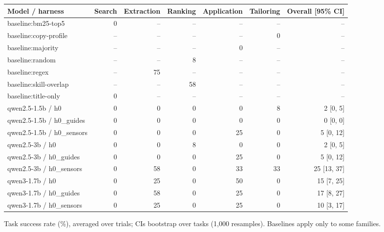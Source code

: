 {\small
\begin{adjustbox}{max width=\linewidth}
\begin{tabular}{lrrrrrr}
\toprule
Model / harness & Search & Extraction & Ranking & Application & Tailoring & Overall [95\% CI] \\
\midrule
baseline:bm25-top5 & 0 & -- & -- & -- & -- & -- \\
baseline:copy-profile & -- & -- & -- & -- & 0 & -- \\
baseline:majority & -- & -- & -- & 0 & -- & -- \\
baseline:random & -- & -- & 8 & -- & -- & -- \\
baseline:regex & -- & 75 & -- & -- & -- & -- \\
baseline:skill-overlap & -- & -- & 58 & -- & -- & -- \\
baseline:title-only & 0 & -- & -- & -- & -- & -- \\
qwen2.5-1.5b / h0 & 0 & 0 & 0 & 0 & 8 & 2 [0, 5] \\
qwen2.5-1.5b / h0\_guides & 0 & 0 & 0 & 0 & 0 & 0 [0, 0] \\
qwen2.5-1.5b / h0\_sensors & 0 & 0 & 0 & 25 & 0 & 5 [0, 12] \\
qwen2.5-3b / h0 & 0 & 0 & 8 & 0 & 0 & 2 [0, 5] \\
qwen2.5-3b / h0\_guides & 0 & 0 & 0 & 25 & 0 & 5 [0, 12] \\
qwen2.5-3b / h0\_sensors & 0 & 58 & 0 & 33 & 33 & 25 [13, 37] \\
qwen3-1.7b / h0 & 0 & 25 & 0 & 50 & 0 & 15 [7, 25] \\
qwen3-1.7b / h0\_guides & 0 & 58 & 0 & 25 & 0 & 17 [8, 27] \\
qwen3-1.7b / h0\_sensors & 0 & 25 & 0 & 25 & 0 & 10 [3, 17] \\
\bottomrule
\end{tabular}
\end{adjustbox}

\smallskip
{\footnotesize Task success rate (\%), averaged over trials; CIs bootstrap over tasks (1,000 resamples). Baselines apply only to some families.\par}
}
